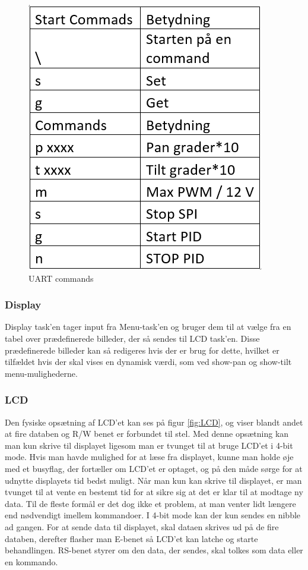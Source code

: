 \begin{figure}[ht]
			\begin{center}
			\includegraphics[scale=0.5]{Billeder/UARTCMD.png}
			\end{center}
			\caption{UART commands}
			\label{fig:UARTCMD}
\end{figure}

\subsubsection{Display}

Display task'en tager input fra Menu-task'en og bruger dem til at vælge fra en tabel over prædefinerede billeder, der så sendes til LCD task'en. Disse prædefinerede billeder kan så redigeres hvis der er brug for dette, hvilket er tilfældet hvis der skal vises en dynamisk værdi, som ved show-pan og show-tilt menu-mulighederne.

\subsubsection{LCD}

Den fysiske opsætning af LCD'et kan ses på figur \ref{fig:LCD}, og viser blandt andet at fire databen og R/W benet er forbundet til stel. Med denne opsætning kan man kun skrive til displayet ligesom man er tvunget til at bruge LCD'et i 4-bit mode. Hvis man havde mulighed for at læse fra displayet, kunne man holde øje med et busyflag, der fortæller om LCD'et er optaget, og på den måde sørge for at udnytte displayets tid bedst muligt. Når man kun kan skrive til displayet, er man tvunget til at vente en bestemt tid for at sikre sig at det er klar til at modtage ny data. Til de fleste formål er det dog ikke et problem, at man venter lidt længere end nødvendigt imellem kommandoer. I 4-bit mode kan der kun sendes en nibble ad gangen. For at sende data til displayet, skal dataen skrives ud på de fire databen, derefter flasher man E-benet så LCD'et kan latche og starte behandlingen. RS-benet styrer om den data, der sendes, skal tolkes som data eller en kommando. 

